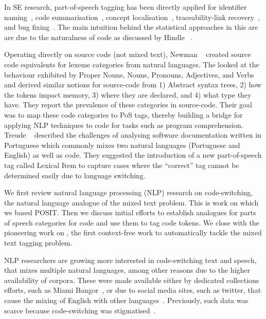 In SE research, part-of-speech tagging has been directly applied for identifier
naming~\cite{Binkley2011}, code summarisation~\cite{Haiduc2010a, Haiduc2010b},
concept localisation~\cite{Abebe2010}, traceability-link
recovery~\cite{Capobianco2013}, and bug fixing~\cite{Tian2015}. The main intuition behind the statistical approaches in this are are due to the naturalness of code as discussed by Hindle \etal~\cite{hindle2012naturalness}.

Operating directly on source code (not mixed text), Newman
\etal~\cite{Newman2017} created source code equivalents for lexeme categories
from natural languages. The looked at the behaviour exhibited by Proper Nouns,
Nouns, Pronouns, Adjectives, and Verbs and derived similar notions for
source-code from 1) Abstract syntax trees, 2) how the tokens impact memory, 3)
where they are declared, and 4) what type they have. They report the prevalence
of these categories in source-code. Their goal was to map these code categories
to PoS tags, thereby building a bridge for applying NLP techniques to code for
tasks such as program comprehension. Treude \etal~\cite{Treude2015portuguese}
described the challenges of analysing software documentation written in
Portuguese which commonly mixes two natural languages (Portuguese and English)
as well as code. They suggested the introduction of a new part-of-speech tag
called Lexical Item to capture cases where the ``correct'' tag cannot be
determined easily due to language switching.

We first review natural language processing
(NLP) research on code-switching, the natural language analogue of the mixed
text problem.  This is work on which we based POSIT.  Then we discuss initial
efforts to establish analogues for parts of speech categories for code and use
them to tag code tokens.  We close with the pioneering work on \stormed, the
first context-free work to automatically tackle the mixed text tagging problem.

NLP researchers are growing more interested in code-switching text and speech,
\ie that mixes multiple natural languages, among other reasons due to the higher
availability of corpora. These were made available either by dedicated
collections efforts, such as Miami Bangor~\cite{bangorTalk}, or due to social
media sites, such as twitter, that cause the mixing of English with other
languages~\cite{Vyas2014}. Previously, such data was scarce because
code-switching was stigmatised~\cite{Poplack1980}. 

